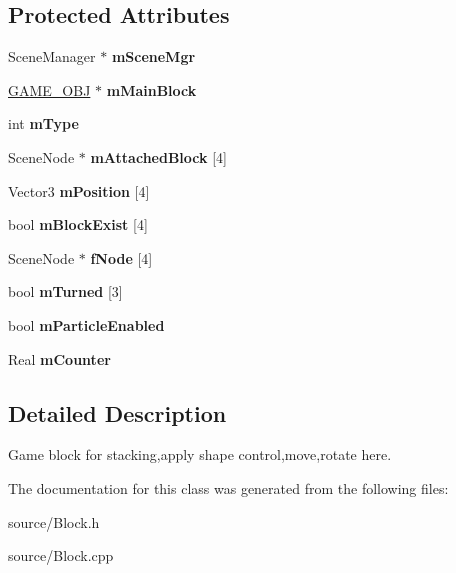\subsection*{Protected Attributes}
\begin{DoxyCompactItemize}
\item 
\hypertarget{class_block_a39d1d43e2c8bb1ed61846e678ac2db50}{Scene\-Manager $\ast$ {\bfseries m\-Scene\-Mgr}}\label{class_block_a39d1d43e2c8bb1ed61846e678ac2db50}

\item 
\hypertarget{class_block_a0ccea414cd192f094f24033a01842f01}{\hyperlink{class_g_a_m_e___o_b_j}{G\-A\-M\-E\-\_\-\-O\-B\-J} $\ast$ {\bfseries m\-Main\-Block}}\label{class_block_a0ccea414cd192f094f24033a01842f01}

\item 
\hypertarget{class_block_a987d469a443bac87614d28de94afb888}{int {\bfseries m\-Type}}\label{class_block_a987d469a443bac87614d28de94afb888}

\item 
\hypertarget{class_block_a6a0e35872ead11932e19d6db2c05c70e}{Scene\-Node $\ast$ {\bfseries m\-Attached\-Block} \mbox{[}4\mbox{]}}\label{class_block_a6a0e35872ead11932e19d6db2c05c70e}

\item 
\hypertarget{class_block_af31ceac23c4ac8d54563724a4037c60a}{Vector3 {\bfseries m\-Position} \mbox{[}4\mbox{]}}\label{class_block_af31ceac23c4ac8d54563724a4037c60a}

\item 
\hypertarget{class_block_ab59a6d207ffd4a29da3c5e9e1e31cf82}{bool {\bfseries m\-Block\-Exist} \mbox{[}4\mbox{]}}\label{class_block_ab59a6d207ffd4a29da3c5e9e1e31cf82}

\item 
\hypertarget{class_block_a3fccba5f9fa086791928ef553584994e}{Scene\-Node $\ast$ {\bfseries f\-Node} \mbox{[}4\mbox{]}}\label{class_block_a3fccba5f9fa086791928ef553584994e}

\item 
\hypertarget{class_block_ad9374c927012d94bdcdad9e83a891ca3}{bool {\bfseries m\-Turned} \mbox{[}3\mbox{]}}\label{class_block_ad9374c927012d94bdcdad9e83a891ca3}

\item 
\hypertarget{class_block_a7f2f9acf4d53436a32fdfe33d106bad1}{bool {\bfseries m\-Particle\-Enabled}}\label{class_block_a7f2f9acf4d53436a32fdfe33d106bad1}

\item 
\hypertarget{class_block_a5b6bddeced665c17cd9b984f3d3ed0f6}{Real {\bfseries m\-Counter}}\label{class_block_a5b6bddeced665c17cd9b984f3d3ed0f6}

\end{DoxyCompactItemize}


\subsection{Detailed Description}
Game block for stacking,apply shape control,move,rotate here. 

The documentation for this class was generated from the following files\-:\begin{DoxyCompactItemize}
\item 
source/Block.\-h\item 
source/Block.\-cpp\end{DoxyCompactItemize}
